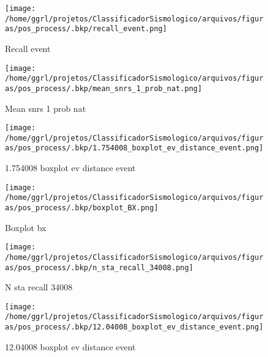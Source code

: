                     \begin{figure}[H]
                        \centering
                        \texttt{[image: /home/ggrl/projetos/ClassificadorSismologico/arquivos/figuras/pos\_process/.bkp/recall\_event.png]}
                        \caption{Recall event}
                        \label{fig:recall_event}
                    \end{figure}
                

                    \begin{figure}[H]
                        \centering
                        \texttt{[image: /home/ggrl/projetos/ClassificadorSismologico/arquivos/figuras/pos\_process/.bkp/mean\_snrs\_1\_prob\_nat.png]}
                        \caption{Mean snrs 1 prob nat}
                        \label{fig:mean_snrs_1_prob_nat}
                    \end{figure}
                

                    \begin{figure}[H]
                        \centering
                        \texttt{[image: /home/ggrl/projetos/ClassificadorSismologico/arquivos/figuras/pos\_process/.bkp/1.754008\_boxplot\_ev\_distance\_event.png]}
                        \caption{1.754008 boxplot ev distance event}
                        \label{fig:1.754008_boxplot_ev_distance_event}
                    \end{figure}
                

                    \begin{figure}[H]
                        \centering
                        \texttt{[image: /home/ggrl/projetos/ClassificadorSismologico/arquivos/figuras/pos\_process/.bkp/boxplot\_BX.png]}
                        \caption{Boxplot bx}
                        \label{fig:boxplot_BX}
                    \end{figure}
                

                    \begin{figure}[H]
                        \centering
                        \texttt{[image: /home/ggrl/projetos/ClassificadorSismologico/arquivos/figuras/pos\_process/.bkp/n\_sta\_recall\_34008.png]}
                        \caption{N sta recall 34008}
                        \label{fig:n_sta_recall_34008}
                    \end{figure}
                

                    \begin{figure}[H]
                        \centering
                        \texttt{[image: /home/ggrl/projetos/ClassificadorSismologico/arquivos/figuras/pos\_process/.bkp/12.04008\_boxplot\_ev\_distance\_event.png]}
                        \caption{12.04008 boxplot ev distance event}
                        \label{fig:12.04008_boxplot_ev_distance_event}
                    \end{figure}
                

